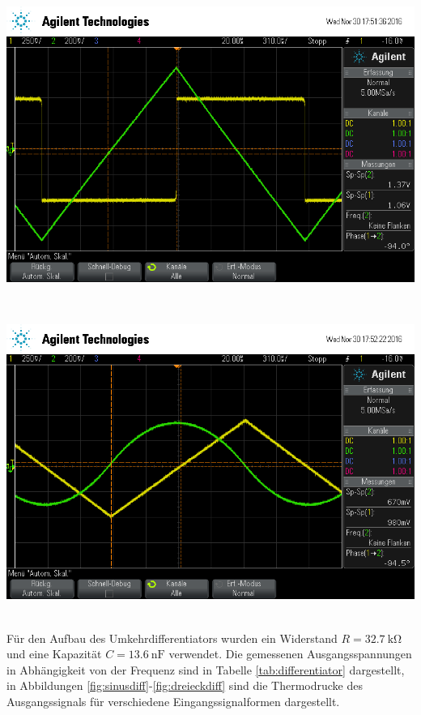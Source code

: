 \documentclass[]{scrartcl}
\begin{document}
\hspace{0.1\textwidth}
\begin{minipage}[t]{0.5\textwidth}
	\includegraphics[width=\textwidth]{images/rechteck_int}
	\label{fig:rechteckint}
\end{minipage} \\
\begin{minipage}[t]{0.5\textwidth}
	\includegraphics[width=\textwidth]{images/dreieck_int}
	\label{fig:dreieckint}
\end{minipage} \\
Für den Aufbau des Umkehrdifferentiators wurden ein Widerstand $R=\SI{32.7}{\kilo\ohm}$ und eine Kapazität $C=\SI{13.6}{\nano\farad}$ verwendet. Die gemessenen Ausgangsspannungen in Abhängigkeit von der Frequenz sind in Tabelle \ref{tab:differentiator} dargestellt, in Abbildungen \ref{fig:sinusdiff}-\ref{fig:dreieckdiff} sind die Thermodrucke des Ausgangssignals für verschiedene Eingangssignalformen dargestellt.
\end{document}
